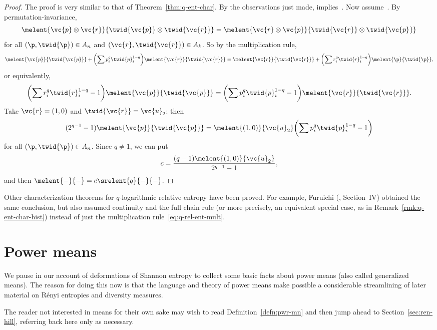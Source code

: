 \begin{proof}
The proof is very similar to that of Theorem~\ref{thm:q-ent-char}.
By the observations just made, 
implies~.  Now
assume~.  By permutation-invariance,
\[
\melent{\vc{p} \otimes \vc{r}}{\twid{\vc{p}} \otimes \twid{\vc{r}}}
=
\melent{\vc{r} \otimes \vc{p}}{\twid{\vc{r}} \otimes \twid{\vc{p}}}
\]
for all $(\p, \twid{\p}) \in A_n$ and $(\vc{r}, \twid{\vc{r}})
\in A_k$.  So by the multiplication rule,
\[
\melent{\vc{p}}{\twid{\vc{p}}}
+ 
\biggl( \sum p_i^q \twid{p}_i^{1 - q} \biggr)
\melent{\vc{r}}{\twid{\vc{r}}}
=
\melent{\vc{r}}{\twid{\vc{r}}}
+ 
\biggl( \sum r_i^q \twid{r}_i^{1 - q} \biggr)
\melent{\p}{\twid{\p}},
\]
or equivalently,
\[
\biggl( \sum r_i^q \twid{r}_i^{1 - q} - 1 \biggr) 
\melent{\vc{p}}{\twid{\vc{p}}}
=
\biggl( \sum p_i^q \twid{p}_i^{1 - q} - 1 \biggr) 
\melent{\vc{r}}{\twid{\vc{r}}}.
\]
Take $\vc{r} = (1, 0)$ and $\twid{\vc{r}} = \vc{u}_2$: then
\[
(2^{q - 1} - 1) \melent{\vc{p}}{\twid{\vc{p}}}
=
\melent{(1, 0)}{\vc{u}_2} 
\biggl( \sum p_i^q \twid{p}_i^{1 - q} - 1 \biggr)
\]
for all $(\p, \twid{\p}) \in A_n$.  Since $q \neq 1$, we can put 
\[
c 
=
\frac{(q - 1)\melent{(1, 0)}{\vc{u}_2}}{2^{q - 1} - 1},
\]
and then $\melent{-}{-} = c \srelent{q}{-}{-}$.
\end{proof}

\begin{remark}
Other characterization theorems for $q$-logarithmic relative entropy have
been proved.  For example, Furuichi (\cite{Furu}, Section~IV) obtained the
same conclusion, but also assumed continuity and the full chain rule (or
more precisely, an equivalent special case, as in
Remark~\ref{rmk:q-ent-char-hist}) instead of just the multiplication
rule~\eqref{eq:q-rel-ent-mult}.
\end{remark}


\section{Power means}


We pause in our account of deformations of Shannon entropy to collect some
basic facts about power means (also called generalized means).  The reason
for doing this now is that the language and theory of power means make
possible a considerable streamlining of later material on R\'enyi entropies
and diversity measures.

The reader not interested in means for their own sake may wish to read 
Definition~\ref{defn:pwr-mn} and then jump ahead
to Section~\ref{sec:ren-hill}, referring back here only as necessary.  


